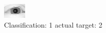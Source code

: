\begin{figure}[h!]
\begin{center}
\includegraphics[width=0.60\columnwidth]{figures/ID3073_class_1_target_2.png}
\end{center}
\caption{ Classification: 1 actual target: 2}
\label{fig:ID3073_class_1_target_2}
\end{figure}
